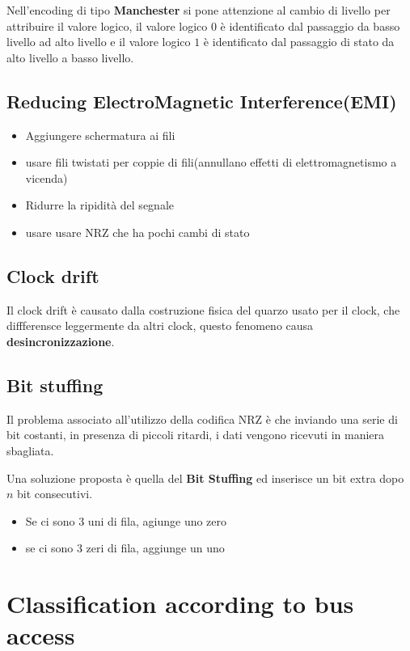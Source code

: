 Nell'encoding di tipo \textbf{Manchester} si pone attenzione al cambio di livello per attribuire il valore logico, il valore logico $0$ è identificato dal passaggio da basso livello ad alto livello e il valore logico $1$ è identificato dal passaggio di stato da alto livello a basso livello.



\subsection{Reducing ElectroMagnetic Interference(EMI)}

\begin{itemize}
  \item Aggiungere schermatura ai fili
  \item usare fili twistati per coppie di fili(annullano effetti di elettromagnetismo a vicenda)
  \item Ridurre la ripidità del segnale
  \item usare usare NRZ che ha pochi cambi di stato
\end{itemize}

\subsection{Clock drift}

Il clock drift è causato dalla costruzione fisica del quarzo usato per il clock, che diffferensce leggermente da altri clock, questo fenomeno causa \textbf{desincronizzazione}.
\subsection{Bit stuffing}
Il problema associato all'utilizzo della codifica NRZ è che inviando una serie di bit costanti, in presenza di piccoli ritardi, i dati vengono ricevuti in maniera sbagliata.

Una soluzione proposta è quella del \textbf{Bit Stuffing} ed inserisce un bit extra dopo $n$ bit consecutivi.
\begin{itemize}
  \item Se ci sono 3 uni di fila, agiunge uno zero
  \item se ci sono 3 zeri di fila, aggiunge un uno
\end{itemize}


\section{Classification according to bus access}

